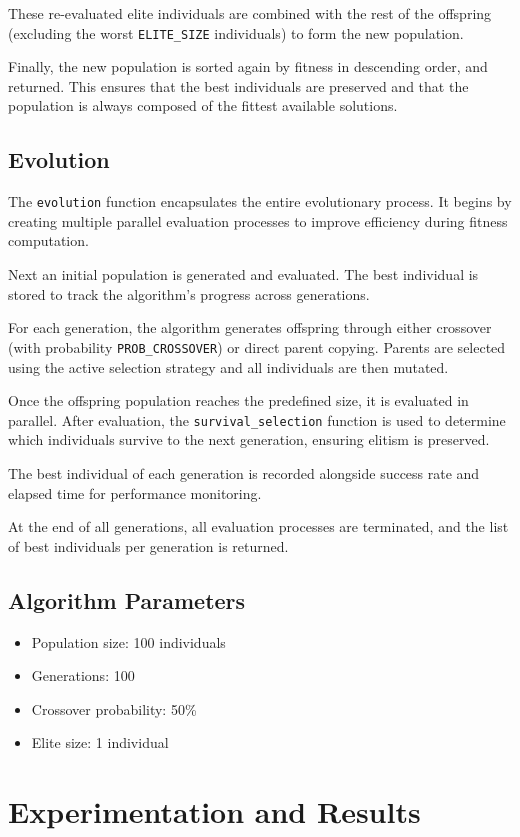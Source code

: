 \documentclass{article}
\begin{document}
These re-evaluated elite individuals are combined with the rest of the offspring (excluding the worst \texttt{ELITE\_SIZE} individuals) to form the new population.

Finally, the new population is sorted again by fitness in descending order, and returned. This ensures that the best individuals are preserved and that the population is always composed of the fittest available solutions.
\subsection{Evolution}
The \texttt{evolution} function encapsulates the entire evolutionary process. It begins by creating multiple parallel evaluation processes to improve efficiency during fitness computation.

Next an initial population is generated and evaluated. The best individual is stored to track the algorithm’s progress across generations.

For each generation, the algorithm generates offspring through either crossover (with probability \texttt{PROB\_CROSSOVER}) or direct parent copying. Parents are selected using the active selection strategy and all individuals are then mutated.

Once the offspring population reaches the predefined size, it is evaluated in parallel. After evaluation, the \texttt{survival\_selection} function is used to determine which individuals survive to the next generation, ensuring elitism is preserved.

The best individual of each generation is recorded alongside success rate and elapsed time for performance monitoring.

At the end of all generations, all evaluation processes are terminated, and the list of best individuals per generation is returned.

\subsection{Algorithm Parameters}
\begin{itemize}
    \item Population size: 100 individuals
    \item Generations: 100
    \item Crossover probability: 50\%
    \item Elite size: 1 individual
\end{itemize}

\section{Experimentation and Results}
\end{document}
